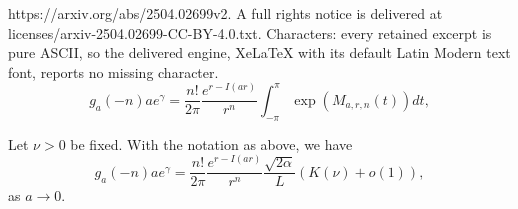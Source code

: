 \documentclass[10pt,a4paper]{amsart}
\begin{document}
https://arxiv.org/abs/2504.02699v2. A full rights notice is delivered at licenses/arxiv-2504.02699-CC-BY-4.0.txt. Characters: every retained excerpt is pure ASCII, so the delivered engine, XeLaTeX with its default Latin Modern text font, reports no missing character.
\begin{equation}\label{gacint}
 g_a(-n) a e^\gamma 
= \frac{n!}{2\pi } \frac{e^{r-I(ar)}}{r^n}  \int_{-\pi}^\pi \exp\left(M_{a,r,n}(t)\right)dt,
\end{equation}

\begin{proposition}\label{proplambdaub}
Let $\nu>0$ be fixed. With the notation as above, we have 
\begin{equation*}
 g_a(-n) a e^\gamma 
= \frac{n!}{2\pi } \frac{e^{r-I(ar)}}{r^n}  \frac{\sqrt{2\alpha}}{L} ( K(\nu) + o(1)),
\end{equation*}
as $a \to 0$. 
\end{proposition}
\end{document}
